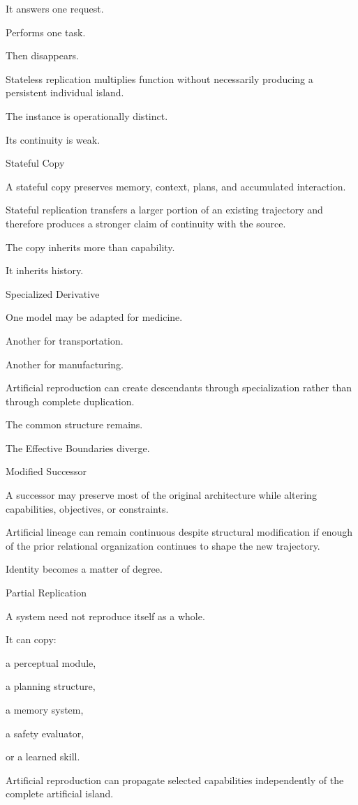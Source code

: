 It answers one request.

Performs one task.

Then disappears.

Stateless replication multiplies function without necessarily producing a persistent individual island.

The instance is operationally distinct.

Its continuity is weak.

Stateful Copy

A stateful copy preserves memory, context, plans, and accumulated interaction.

Stateful replication transfers a larger portion of an existing trajectory and therefore produces a stronger claim of continuity with the source.

The copy inherits more than capability.

It inherits history.

Specialized Derivative

One model may be adapted for medicine.

Another for transportation.

Another for manufacturing.

Artificial reproduction can create descendants through specialization rather than through complete duplication.

The common structure remains.

The Effective Boundaries diverge.

Modified Successor

A successor may preserve most of the original architecture while altering capabilities, objectives, or constraints.

Artificial lineage can remain continuous despite structural modification if enough of the prior relational organization continues to shape the new trajectory.

Identity becomes a matter of degree.

Partial Replication

A system need not reproduce itself as a whole.

It can copy:

a perceptual module,

a planning structure,

a memory system,

a safety evaluator,

or a learned skill.

Artificial reproduction can propagate selected capabilities independently of the complete artificial island.

